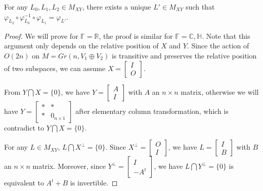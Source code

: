 \documentclass[10pt,a4paper]{amsart}
\begin{document}
\begin{lem}
For any $L_0, L_1, L_2 \in M_{XY}$, there exists a unique $L' \in M_{XY}$ such that
$\varphi_{L_2}\circ \varphi_{L_0}^{-1}\circ \varphi_{L_1}=\varphi_{L'}$.
\end{lem}

\begin{proof}
We will prove for $\mathbb{F}=\mathbb{R}$, the proof is similar for $\mathbb{F}=\mathbb{C},\mathbb{H}$. Note that this argument only depends on the
relative position of $X$ and $Y$. Since the action of $O(2n)$  on $M=Gr(n,V_1\oplus V_2)$
 is transitive and preserves the relative position of two subspaces, we can assume $X=\left[
\begin{array}{cc}
I \\
O \end{array} \right]$.

From $Y\bigcap X=\{0\}$, we have $Y=\left[
\begin{array}{cc}
A \\
I \end{array} \right]$ with $A$ an $n \times n$ matrix, otherwise we will have $Y=\left[
\begin{array}{cc}
* & *\\
* & 0_{n \times 1}\end{array} \right]$ after elementary column transformation, which is contradict to $Y\bigcap X=\{0\}$.

\bigskip

For any  $L \in M_{XY}$, $L \bigcap X^{\bot}=\{0\}$. Since $X^{\bot}=\left[
\begin{array}{cc}
O \\
I \end{array} \right]$, we have  $L=\left[
\begin{array}{cc}
I \\
B \end{array} \right]$ with $B$ an $n \times n$ matrix. Moreover,  since $Y^{\bot}=\left[
\begin{array}{cc}
I \\
-A^t \end{array} \right]$, we have $L \bigcap Y^{\bot}=\{0\}$ is equivalent to $A^t+B$ is invertible.

\bigskip


\end{proof}
\end{document}
